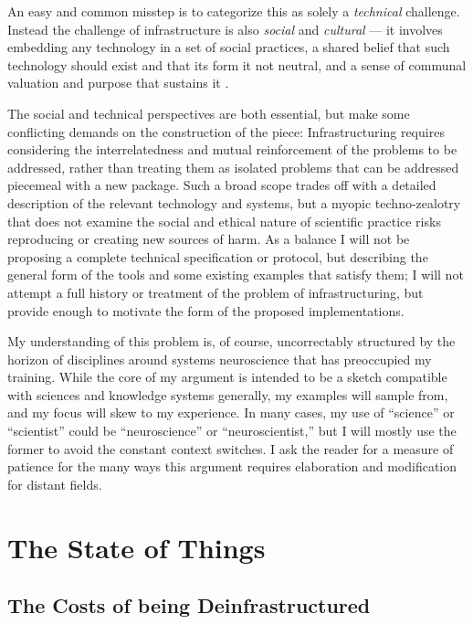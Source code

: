 \documentclass[10pt]{article}
\begin{document}
\begin{multicols}{2}
An easy and common misstep is to categorize this as solely a
\emph{technical} challenge. Instead the challenge of infrastructure is
also \emph{social} and \emph{cultural} --- it involves embedding any
technology in a set of social practices, a shared belief that such
technology should exist and that its form it not neutral, and a sense of
communal valuation and purpose that sustains it \cite{bietzSustainingDevelopmentCyberinfrastructure2012} .

The social and technical perspectives are both essential, but make some
conflicting demands on the construction of the piece: Infrastructuring
requires considering the interrelatedness and mutual reinforcement of
the problems to be addressed, rather than treating them as isolated
problems that can be addressed piecemeal with a new package. Such a
broad scope trades off with a detailed description of the relevant
technology and systems, but a myopic techno-zealotry that does not
examine the social and ethical nature of scientific practice risks
reproducing or creating new sources of harm. As a balance I will not be
proposing a complete technical specification or protocol, but describing
the general form of the tools and some existing examples that satisfy
them; I will not attempt a full history or treatment of the problem of
infrastructuring, but provide enough to motivate the form of the
proposed implementations.

My understanding of this problem is, of course, uncorrectably structured
by the horizon of disciplines around systems neuroscience that has
preoccupied my training. While the core of my argument is intended to be
a sketch compatible with sciences and knowledge systems generally, my
examples will sample from, and my focus will skew to my experience. In
many cases, my use of ``science'' or ``scientist'' could be
``neuroscience'' or ``neuroscientist,'' but I will mostly use the former
to avoid the constant context switches. I ask the reader for a measure
of patience for the many ways this argument requires elaboration and
modification for distant fields. 
\end{multicols}


\hypertarget{the-state-of-things}{%
\section{The State of Things}\label{the-state-of-things}}

\hypertarget{the-costs-of-being-deinfrastructured}{%
\subsection{The Costs of being
Deinfrastructured}\label{the-costs-of-being-deinfrastructured}}
\end{document}
